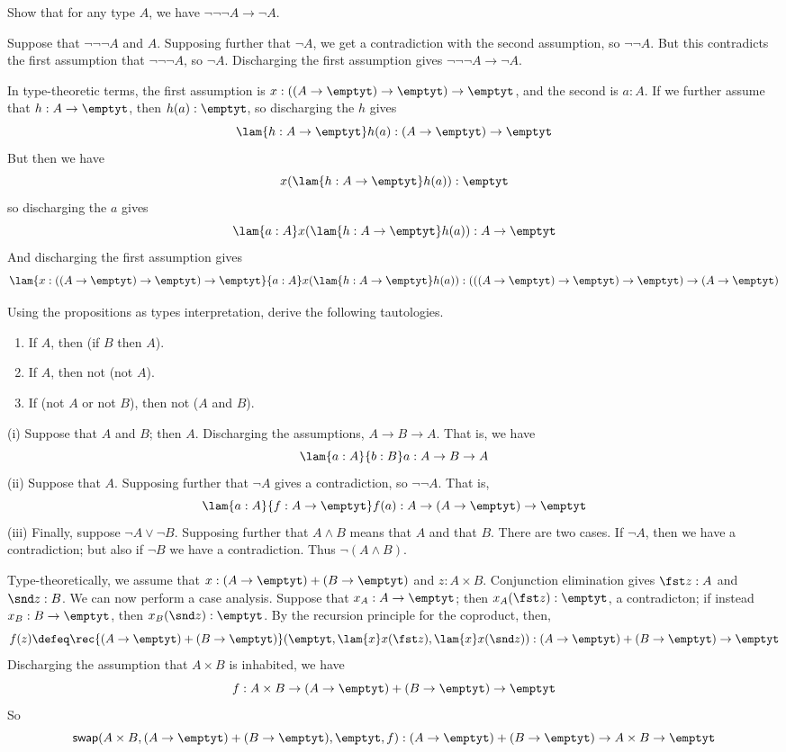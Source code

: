   Show that for any type $A$, we have $\lnot\lnot\lnot A \to
\lnot A$.

\soln Suppose that $\lnot\lnot\lnot A$ and $A$.  Supposing further that $\lnot
A$, we get a contradiction with the second assumption, so $\lnot \lnot A$.  But
this contradicts the first assumption that $\lnot\lnot\lnot A$, so $\lnot A$.
Discharging the first assumption gives $\lnot\lnot\lnot A \to \lnot A$.

In type-theoretic terms, the first assumption is $x : ((A \to \emptyt) \to
\emptyt) \to \emptyt$, and the second is $a : A$.  If we further assume that
$h : A \to \emptyt$, then $h(a) : \emptyt$, so discharging the $h$ gives
\[
  \lam{h:A \to \emptyt}h(a) : (A \to \emptyt) \to \emptyt
\]
But then we have
\[
  x(\lam{h : A \to \emptyt}h(a)) : \emptyt
\]
so discharging the $a$ gives
\[
  \lam{a:A}x(\lam{h : A \to \emptyt}h(a)) : A \to \emptyt
\]
And discharging the first assumption gives
\[
  \lam{x:((A\to\emptyt)\to\emptyt)\to\emptyt}{a:A}x(\lam{h : A \to
    \emptyt}h(a)) :
  (((A \to \emptyt) \to \emptyt) \to \emptyt) \to (A \to \emptyt)
\]

  Using the propositions as types interpretation, derive the
following tautologies.
\begin{enumerate}
  \item If $A$, then (if $B$ then $A$).
  \item If $A$, then not (not $A$).
  \item If (not $A$ or not $B$), then not ($A$ and $B$).
\end{enumerate}

\soln (i)  Suppose that $A$ and $B$; then $A$.  Discharging the
assumptions, $A \to B \to A$.  That is, we
have 
\[
  \lam{a:A}{b:B}a : A \to B \to A
\]
(ii)  Suppose that $A$.  Supposing further that $\lnot A$ gives a
contradiction, so $\lnot\lnot A$.  That is,
\[
  \lam{a:A}{f:A \to \emptyt}f(a) : A \to (A \to \emptyt) \to \emptyt
\]
(iii)
Finally, suppose $\lnot A \lor \lnot B$.  Supposing further that $A \land B$
means that $A$ and that $B$.  There are two cases.  If $\lnot A$, then we have
a contradiction; but also if $\lnot B$ we have a contradiction.  Thus $\lnot (A
\land B)$.

Type-theoretically, we assume that $x : (A \to\emptyt) + (B \to\emptyt)$ and $z
: A \times B$.  Conjunction elimination gives $\fst z : A$ and $\snd z : B$.
We can now perform a case analysis.  Suppose that $x_{A} : A \to \emptyt$; then
$x_{A}(\fst z) : \emptyt$, a contradicton; if instead $x_{B} : B \to \emptyt$,
then $x_{B}(\snd z) : \emptyt$.  By the recursion principle for the coproduct,
then,
\[
  f(z) \defeq \rec{(A\to\emptyt)+(B\to\emptyt)}(
    \emptyt,
    \lam{x}x(\fst z),
    \lam{x}x(\snd z)
  )
  :
  (A \to \emptyt) + (B \to \emptyt) \to \emptyt
\]
Discharging the assumption that $A \times B$ is inhabited, we have
\[
  f : 
  A \times B \to (A \to \emptyt) + (B \to \emptyt) \to \emptyt
\]
So
\[
  \mathsf{swap}(A\times B, (A\to\emptyt)+(B\to\emptyt), \emptyt, f)
  :
  (A \to \emptyt) + (B \to \emptyt) 
  \to 
  A \times B 
  \to \emptyt
\]



